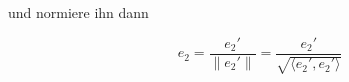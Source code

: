 \begin{enumerate}
    und normiere ihn dann

    \begin{figure*}[h!]
        \begin{minipage}{0.49\textwidth}
            \begin{equation*}
                e_2 = \frac{e_2'}{\| e_2' \|} = \frac{e_2'}{\sqrt{\langle e_2', e_2' \rangle}}
            \end{equation*}        
        \end{minipage}
        \begin{minipage}{0.5\textwidth}
            \centering
            \begin{tikzpicture}[x=0.75pt,y=0.75pt,yscale=-1,xscale=1]
                

\end{tikzpicture}
\end{minipage}
\end{figure*}
\end{enumerate}
